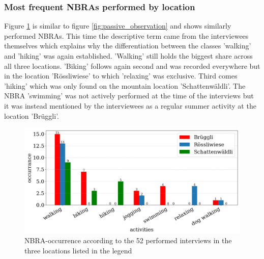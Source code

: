 \subsubsection{Most frequent NBRAs performed by location}
Figure \ref{fig:interview_activities} is similar to figure \ref{fig:passive_observation} and shows similarly performed NBRAs. This time the descriptive term came from the interviewees themselves which explains why the differentiation between the classes 'walking' and 'hiking' was again established. 'Walking' still holds the biggest share across all three locations. 'Biking' follows again second and was recorded everywhere but in the location 'R\"ossliwiese' to which 'relaxing' was exclusive. Third comes 'hiking' which was only found on the mountain location 'Schattenw\"aldli'. The NBRA 'swimming' was not actively performed at the time of the interviews but it was instead mentioned by the interviewees as a regular summer activity at the location 'Br\"uggli'.
\begin{figure}[h!]
   \centering
   \includegraphics[width=\textwidth]{img/interview_activities.pdf}
   \caption{NBRA-occurrence according to the 52 performed interviews in the three locations listed in the legend}
   \label{fig:interview_activities}
\end{figure}

